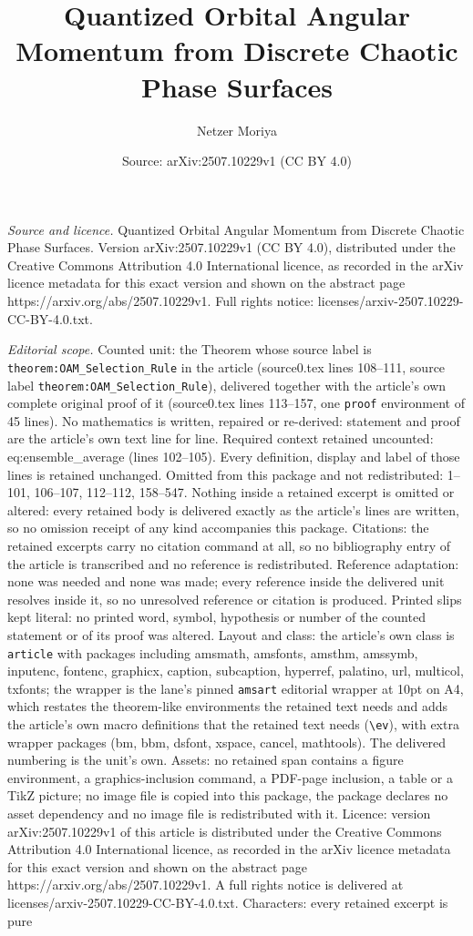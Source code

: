 \documentclass[10pt,a4paper]{amsart}
\title[Quantized Orbital Angular Momentum from Discrete Chaotic Pha]{Quantized Orbital Angular Momentum from Discrete Chaotic Phase Surfaces}
\author{Netzer Moriya}
\date{Source: arXiv:2507.10229v1 (CC BY 4.0)}
\begin{document}
\maketitle

\noindent\emph{Source and licence.} Quantized Orbital Angular Momentum from Discrete Chaotic Phase Surfaces. Version arXiv:2507.10229v1 (CC BY 4.0), distributed under the Creative Commons Attribution 4.0 International licence, as recorded in the arXiv licence metadata for this exact version and shown on the abstract page https://arxiv.org/abs/2507.10229v1. Full rights notice: licenses/arxiv-2507.10229-CC-BY-4.0.txt.\par\smallskip

\noindent\textit{Editorial scope.} Counted unit: the Theorem whose source label is \texttt{theorem:OAM\_Selection\_Rule} in the article (source0.tex lines 108--111, source label \texttt{theorem:OAM\_Selection\_Rule}), delivered together with the article's own complete original proof of it (source0.tex lines 113--157, one \texttt{proof} environment of 45 lines). No mathematics is written, repaired or re-derived: statement and proof are the article's own text line for line. Required context retained uncounted: eq:ensemble\_average (lines 102--105). Every definition, display and label of those lines is retained unchanged. Omitted from this package and not redistributed: 1--101, 106--107, 112--112, 158--547. Nothing inside a retained excerpt is omitted or altered: every retained body is delivered exactly as the article's lines are written, so no omission receipt of any kind accompanies this package. Citations: the retained excerpts carry no citation command at all, so no bibliography entry of the article is transcribed and no reference is redistributed. Reference adaptation: none was needed and none was made; every reference inside the delivered unit resolves inside it, so no unresolved reference or citation is produced. Printed slips kept literal: no printed word, symbol, hypothesis or number of the counted statement or of its proof was altered. Layout and class: the article's own class is \texttt{article} with packages including amsmath, amsfonts, amsthm, amssymb, inputenc, fontenc, graphicx, caption, subcaption, hyperref, palatino, url, multicol, txfonts; the wrapper is the lane's pinned \texttt{amsart} editorial wrapper at 10pt on A4, which restates the theorem-like environments the retained text needs and adds the article's own macro definitions that the retained text needs (\texttt{\textbackslash ev}), with extra wrapper packages (bm, bbm, dsfont, xspace, cancel, mathtools). The delivered numbering is the unit's own. Assets: no retained span contains a figure environment, a graphics-inclusion command, a PDF-page inclusion, a table or a TikZ picture; no image file is copied into this package, the package declares no asset dependency and no image file is redistributed with it. Licence: version arXiv:2507.10229v1 of this article is distributed under the Creative Commons Attribution 4.0 International licence, as recorded in the arXiv licence metadata for this exact version and shown on the abstract page https://arxiv.org/abs/2507.10229v1. A full rights notice is delivered at licenses/arxiv-2507.10229-CC-BY-4.0.txt. Characters: every retained excerpt is pure 
\end{document}

